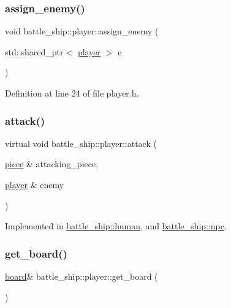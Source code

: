 \subsubsection{\texorpdfstring{assign\+\_\+enemy()}{assign\_enemy()}}
{\footnotesize\ttfamily void battle\+\_\+ship\+::player\+::assign\+\_\+enemy (\begin{DoxyParamCaption}\item[{std\+::shared\+\_\+ptr$<$ \hyperlink{classbattle__ship_1_1player}{player} $>$}]{e }\end{DoxyParamCaption})\hspace{0.3cm}{\ttfamily [inline]}}



Definition at line 24 of file player.\+h.

\mbox{\label{classbattle__ship_1_1player_a86be2256620cd5e20da6db7be8afdbc8}} 
\subsubsection{\texorpdfstring{attack()}{attack()}}
{\footnotesize\ttfamily virtual void battle\+\_\+ship\+::player\+::attack (\begin{DoxyParamCaption}\item[{\hyperlink{classbattle__ship_1_1piece}{piece} \&}]{attacking\+\_\+piece,  }\item[{\hyperlink{classbattle__ship_1_1player}{player} \&}]{enemy }\end{DoxyParamCaption})\hspace{0.3cm}{\ttfamily [pure virtual]}}



Implemented in \hyperlink{classbattle__ship_1_1human_ad89701f0c4dd688c564b14a015059386}{battle\+\_\+ship\+::human}, and \hyperlink{classbattle__ship_1_1npc_abe6ec844c73c5410c2c4887fd50fac06}{battle\+\_\+ship\+::npc}.

\mbox{\label{classbattle__ship_1_1player_a57dacb55b2c506191d3d8426097c3c6a}} 
\subsubsection{\texorpdfstring{get\+\_\+board()}{get\_board()}}
{\footnotesize\ttfamily \hyperlink{classbattle__ship_1_1board}{board}\& battle\+\_\+ship\+::player\+::get\+\_\+board (\begin{DoxyParamCaption}{ }\end{DoxyParamCaption})\hspace{0.3cm}{\ttfamily [inline]}}



